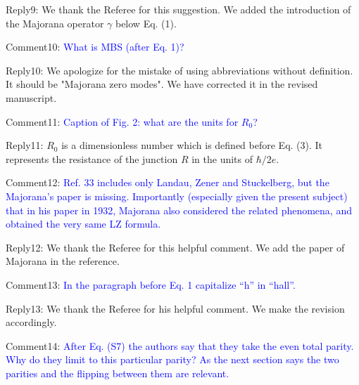 \documentclass[onecolumn,preprintnumbers,amsmath,amssymb,prb]{revtex4}
\newcommand{\blue}[1]{\textcolor{blue}{#1}}
\begin{document}
\noindent Reply9: We thank the Referee for this suggestion. We added the introduction of the Majorana operator $\gamma$ below Eq. (1).




\vspace{5mm}

\noindent Comment10:
\blue{What is MBS (after Eq. 1)?}


\vspace{5mm}


\noindent Reply10: We apologize for the mistake of using abbreviations without definition. It should be "Majorana zero modes". We have corrected it in the revised manuscript.


\vspace{5mm}

\noindent Comment11:
\blue{Caption of Fig. 2: what are the units for $R_{0}$?}


\vspace{5mm}


\noindent Reply11: $R_0$ is a dimensionless number which is defined before Eq. (3). It represents the resistance of the junction $R$ in the units of $\hbar/2e$.


\vspace{5mm}

\noindent Comment12:
\blue{Ref. 33 includes only Landau, Zener and Stuckelberg, but the
Majorana’s paper is missing. Importantly (especially given the present
subject) that in his paper in 1932, Majorana also considered the
related phenomena, and obtained the very same LZ formula.}


\vspace{5mm}


\noindent Reply12: We thank the Referee for this helpful comment. We add the paper of Majorana in the reference.

\vspace{5mm}

\noindent Comment13:
\blue{In the paragraph before Eq. 1 capitalize “h” in “hall”.}


\vspace{5mm}


\noindent Reply13: We thank the Referee for his helpful comment. We make the revision accordingly.

\vspace{5mm}

\noindent Comment14:
\blue{After Eq. (S7) the authors say that they take the even total parity.
Why do they limit to this particular parity? As the next section says
the two parities and the flipping between them are relevant.}
\end{document}
